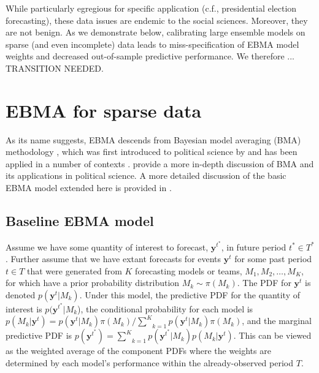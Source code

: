 \documentclass[12pt,fullpage,endnotes]{article}
\begin{document}
While particularly egregious for specific application (c.f.,
presidential election forecasting), these data issues are endemic to
the social sciences.  Moreover, they are not benign.  As we
demonstrate below, calibrating large ensemble models on sparse (and
even incomplete) data leads to miss-specification of EBMA model
weights and decreased out-of-sample predictive performance.  We
therefore ... TRANSITION NEEDED.

\section{EBMA for sparse data} 
\label{model}


As its name suggests, EBMA descends from Bayesian model averaging
(BMA) methodology \citep[c.f.,][]{Madigan:1994, Raftery:1995,
  Hoeting:1999, Clyde:2003, Clyde:2004}, which was first introduced to
political science by \citet{Bartels:1997} and has been applied in a
number of contexts \citep[e.g.,][]{Bartels:2001, Gill:2004,
  Imai:2004}. 
provide a more in-depth discussion of BMA and its applications in
political science.  A more detailed discussion of the basic EBMA model
extended here is provided in \citet{mhw:2012}.

\subsection{Baseline EBMA model}

Assume we have some quantity of interest to forecast,
$\mathbf{y}^{t^*}$, in future period $t^\ast \in T^\ast$.  Further
assume that we have extant forecasts for events $\mathbf{y}^t$ for
some past period $t \in T$ that were generated from $K$ forecasting
models or teams, $M_1, M_2, \ldots, M_K$, for which have a prior
probability distribution $M_k\sim \pi(M_k)$. The PDF for
$\mathbf{y}^t$ is denoted $p(\mathbf{y}^t|M_k)$.  Under this model,
the predictive PDF for the quantity of interest is
$p(\mathbf{y}^{t^*}|M_k$), the conditional probability for each model
is $p(M_k|\mathbf{y}^t) =
p(\mathbf{y}^t|M_k)\pi(M_k)/\underset{k=1}{\overset{K}{\sum}}p(\mathbf{y}^t|M_k)\pi(M_k)$,
and the marginal predictive PDF is $p(\mathbf{y}^{t^*}) =
\underset{k=1}{\overset{K}{\sum}}
p(\mathbf{y}^{t^*}|M_k)p(M_k|\mathbf{y}^{t})$.  This can be viewed as
the weighted average of the component PDFs where the weights are
determined by each model's performance within the already-observed
period $T$.
\end{document}
